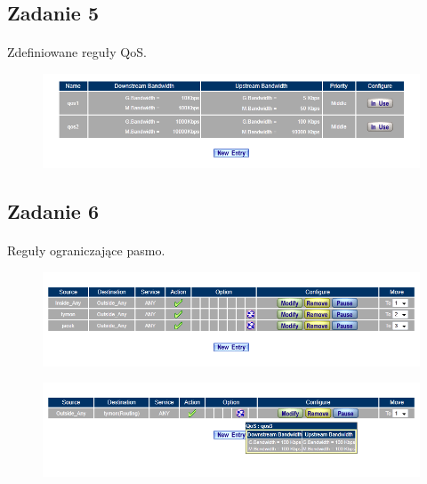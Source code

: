 \documentclass[wide,a4paper,titlepage,12pt] {article}
\begin{document}
  \subsection{Zadanie 5}
  \paragraph{}
  Zdefiniowane reguły QoS.
  \begin{figure}[h!]
    \begin{center}
      \includegraphics[width=\textwidth]{3_5.PNG}
    \end{center}
  \end{figure}


  \newpage
  \subsection{Zadanie 6}
  \paragraph{}
  Reguły ograniczające pasmo.

  \begin{figure}[h!]
    \begin{center}
      \includegraphics[width=\textwidth]{4.PNG}
    \end{center}
  \end{figure}

  \begin{figure}[h!]
    \begin{center}
      \includegraphics[width=\textwidth]{6.PNG}
    \end{center}
  \end{figure}
\end{document}
